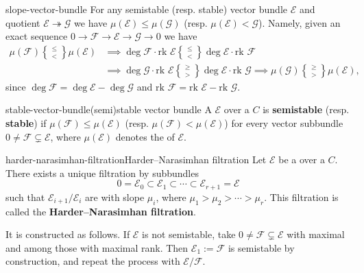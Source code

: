 \begin{example}{slope-vector-bundle}
    For any semistable (resp. stable) vector bundle $\mathcal{E}$ and quotient $\mathcal{E} \twoheadrightarrow \mathcal{G}$ we have $\mu(\mathcal{E}) \le \mu(\mathcal{G})$ (resp. $\mu(\mathcal{E}) < \mathcal{G}$). Namely, given an exact sequence $0 \to \mathcal{F} \to \mathcal{E} \to \mathcal{G} \to 0$ we have
    \[ \begin{aligned} \mu(\mathcal{F}) \genfrac{\{}{\}}{0pt}{1}{\le}{<} \mu(\mathcal{E}) &\implies \deg \mathcal{F} \cdot \text{rk } \mathcal{E} \genfrac{\{}{\}}{0pt}{1}{\le}{<} \deg \mathcal{E} \cdot \text{rk } \mathcal{F} \\ &\implies \deg \mathcal{G} \cdot \text{rk } \mathcal{E} \genfrac{\{}{\}}{0pt}{1}{\ge}{>} \deg \mathcal{E} \cdot \text{rk } \mathcal{G} \implies \mu(\mathcal{G}) \genfrac{\{}{\}}{0pt}{1}{\ge}{>} \mu(\mathcal{E})  , \end{aligned} \]
    since $\deg \mathcal{F} = \deg \mathcal{E} - \deg \mathcal{G}$ and $\text{rk } \mathcal{F} = \text{rk } \mathcal{E} - \text{rk } \mathcal{G}$.
\end{example}

\begin{topic}{stable-vector-bundle}{(semi)stable vector bundle}
    A  $\mathcal{E}$ over a  $C$ is \textbf{semistable} (resp. \textbf{stable}) if $\mu(\mathcal{F}) \le \mu(\mathcal{E})$ (resp. $\mu(\mathcal{F}) < \mu(\mathcal{E})$) for every vector subbundle $0 \ne \mathcal{F} \subsetneq \mathcal{E}$, where $\mu(\mathcal{E})$ denotes the  of $\mathcal{E}$.
\end{topic}

\begin{topic}{harder-narasimhan-filtration}{Harder--Narasimhan filtration}
    Let $\mathcal{E}$ be a  over a  $C$. There exists a unique filtration by subbundles
    \[ 0 = \mathcal{E}_0 \subset \mathcal{E}_1 \subset \cdots \subset \mathcal{E}_{r + 1} = \mathcal{E} \]
    such that $\mathcal{E}_{i + 1}/\mathcal{E}_i$ are  with slope $\mu_i$, where $\mu_1 > \mu_2 > \cdots > \mu_r$. This filtration is called the \textbf{Harder--Narasimhan filtration}.
    
    It is constructed as follows. If $\mathcal{E}$ is not semistable, take $0 \ne \mathcal{F} \subsetneq \mathcal{E}$ with maximal  and among those with maximal rank. Then $\mathcal{E}_1 := \mathcal{F}$ is semistable by construction, and repeat the process with $\mathcal{E}/\mathcal{F}$.
\end{topic}

